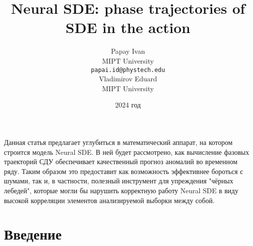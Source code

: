 \documentclass{article}
\title{Neural SDE: phase trajectories of SDE in the action}
\author{ Papay Ivan\\
	MIPT University \\
	\texttt{papai.id@phystech.edu} \\
	\And
	Vladimirov Eduard \\
	MIPT University\\
}
\date{2024 год}
\begin{document}
\maketitle

\begin{Abstract}
    Данная статья предлагает углубиться в математический аппарат, на котором строится модель Neural SDE. В ней будет рассмотрено, как вычисление фазовых траекторий СДУ обеспечивает качественный прогноз аномалий во временном ряду. Таким образом это предоставит как возможность эффективнее бороться с шумами, так и, в частности, полезный инструмент для упреждения "чёрных лебедей", которые могли бы нарушить корректную работу Neural SDE в виду высокой корреляции элементов анализируемой выборки между собой.
\end{Abstract}



\section{Введение}
\end{document}
